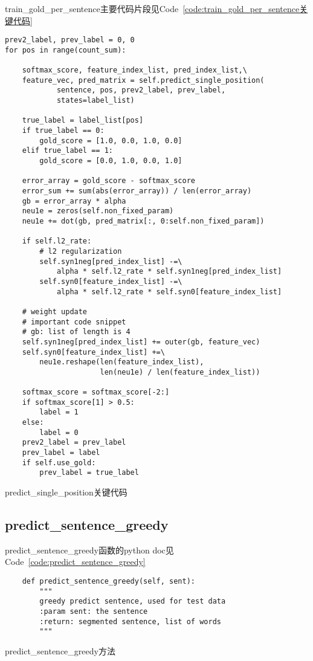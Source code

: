 \documentclass[]{article}
\begin{document}
train\_gold\_per\_sentence主要代码片段见Code~\ref{code:train_gold_per_sentence关键代码}
\begin{listing}[H]
\begin{verbatim}
prev2_label, prev_label = 0, 0
for pos in range(count_sum):

    softmax_score, feature_index_list, pred_index_list,\
    feature_vec, pred_matrix = self.predict_single_position(
            sentence, pos, prev2_label, prev_label,
            states=label_list)

    true_label = label_list[pos]
    if true_label == 0:
        gold_score = [1.0, 0.0, 1.0, 0.0]
    elif true_label == 1:
        gold_score = [0.0, 1.0, 0.0, 1.0]

    error_array = gold_score - softmax_score
    error_sum += sum(abs(error_array)) / len(error_array)
    gb = error_array * alpha
    neu1e = zeros(self.non_fixed_param)
    neu1e += dot(gb, pred_matrix[:, 0:self.non_fixed_param])

    if self.l2_rate:
        # l2 regularization
        self.syn1neg[pred_index_list] -=\
            alpha * self.l2_rate * self.syn1neg[pred_index_list]
        self.syn0[feature_index_list] -=\
            alpha * self.l2_rate * self.syn0[feature_index_list]

    # weight update
    # important code snippet
    # gb: list of length is 4
    self.syn1neg[pred_index_list] += outer(gb, feature_vec)
    self.syn0[feature_index_list] +=\
        neu1e.reshape(len(feature_index_list),
                      len(neu1e) / len(feature_index_list))

    softmax_score = softmax_score[-2:]
    if softmax_score[1] > 0.5:
        label = 1
    else:
        label = 0
    prev2_label = prev_label
    prev_label = label
    if self.use_gold:
        prev_label = true_label
\end{verbatim}
\caption{predict\_single\_position关键代码}
\label{code:train_gold_per_sentence关键代码}
\end{listing}

\subsection{predict\_sentence\_greedy}

predict\_sentence\_greedy函数的python doc见Code~\ref{code:predict_sentence_greedy}
\begin{listing}[H]
\begin{verbatim}
    def predict_sentence_greedy(self, sent):
        """
        greedy predict sentence, used for test data
        :param sent: the sentence
        :return: segmented sentence, list of words
        """
\end{verbatim}
\caption{predict\_sentence\_greedy方法}
\label{code:predict_sentence_greedy}
\end{listing}
\end{document}
